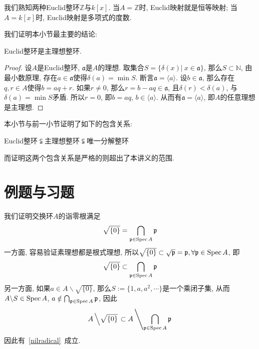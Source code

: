 我们熟知两种Euclid整环$\mathbb{Z}$与$k[x]$.
当$A=\mathbb{Z}$时, Euclid映射就是恒等映射; 当$A=k[x]$时, Euclid映射是多项式的度数.

我们证明本小节最主要的结论:
\begin{prop}
    Euclid整环是主理想整环.
\end{prop}
\begin{proof}
    设$A$是Euclid整环, $\mathfrak{a}$是$A$的理想.
    取集合$S=\{\delta(x)|\ x\in\mathfrak{a}\}$, 那么$S\subset\mathbb{N}$, 由最小数原理, 存在$a\in\mathfrak{a}$使得$\delta(a)=\min{S}$.
    断言$\mathfrak{a}=\langle a\rangle$.
    设$b\in\mathfrak{a}$, 那么存在$q,r\in A$使得$b=aq+r$.
    如果$r\neq 0$, 那么$r=b-aq\in\mathfrak{a}$, 且$\delta(r)<\delta(a)$, 与$\delta(a)=\min{S}$矛盾.
    所以$r=0$, 即$b=aq$, $b\in\langle a\rangle$.
    从而有$\mathfrak{a}=\langle a\rangle$, 即$A$的任意理想是主理想.
\end{proof}

本小节与前一小节证明了如下的包含关系:
\begin{center}
    Euclid整环$\subsetneqq$主理想整环$\subsetneqq$唯一分解整环
\end{center}
而证明这两个包含关系是严格的则超出了本讲义的范围.

\section{例题与习题}

\begin{eg}
    我们证明交换环$A$的诣零根满足
    \begin{equation}
        \sqrt{\{0\}}=\bigcap_{\mathfrak{p}\in\operatorname{Spec}{A}}\mathfrak{p}\label{nilradical}
    \end{equation}
    一方面, 容易验证素理想都是根式理想, 所以$\sqrt{\{0\}}\subset\sqrt{\mathfrak{p}}=\mathfrak{p},\forall\mathfrak{p}\in\operatorname{Spec}{A}$, 即
    \[\sqrt{\{0\}}\subset\bigcap_{\mathfrak{p}\in\operatorname{Spec}{A}}\mathfrak{p}\]
    另一方面, 如果$a\in A\backslash\sqrt{\{0\}}$, 那么$S:=\{1,a,a^2,\cdots\}$是一个乘闭子集, 从而$A\backslash S\in\operatorname{Spec}{A}$, $a\notin\bigcap_{\mathfrak{p}\in\operatorname{Spec}{A}}\mathfrak{p}$, 因此
    \[A\left\backslash\sqrt{\{0\}}\right.\subset A\left\backslash\bigcap_{\mathfrak{p}\in\operatorname{Spec}{A}}\mathfrak{p}\right.\]
    因此有~\eqref{nilradical}~成立.
\end{eg}

